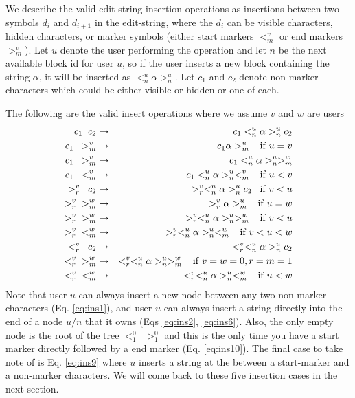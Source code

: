 \documentclass{amsart}
\begin{document}
We describe the valid edit-string insertion operations as insertions
between two symbols $d_i$ and $d_{i+1}$ in the edit-string, where the $d_i$
can be visible characters, hidden characters, or marker symbols (either start
markers $<^v_m$ or end markers $>^v_m$).  Let $u$ denote the user performing
the operation and let $n$ be the next available block id for user $u$, so if
the user inserts a new block containing the string $\alpha$, it will be inserted
as $<^u_n \alpha >^u_n$.  Let $c_1$ and $c_2$ denote non-marker characters
which could be either visible or hidden or one of each.

The following are the valid insert operations where we assume $v$ and $w$
are users
\begin{eqnarray}
c_1\;\; c_2 &\rightarrow& c_1 <^u_n \alpha >^u_n c_2 \label{eq:ins1}\\
c_1\;\; >^v_m &\rightarrow& c_1 \alpha >^u_m \;\;\; {\rm if}\; u=v \label{eq:ins2}\\
c_1\;\;>^v_m &\rightarrow& c_1 <^u_n \alpha >^u_n >^w_m \label{eq:ins3}\\
c_1 \;\;<^v_m &\rightarrow& c_1 <^u_n \alpha >^u_n <^v_m \;\;\; {\rm if}\; u<v \label{eq:ins4}\\
>^v_r \;\;c_2 &\rightarrow& >^v_r  <^u_n \alpha >^u_n c_2 \;\;\; {\rm if} \; v<u \label{eq:ins5}\\
>^v_r \;\;>^w_m &\rightarrow& >^v_r \alpha >^u_m \;\;\; {\rm if}\; u=w \label{eq:ins6}\\
>^v_r \;\;>^w_m &\rightarrow& >^v_r <^u_n \alpha >^u_n >^w_m \;\;\; {\rm if} \; v<u \label{eq:ins7}\\
>^v_r \;\;<^w_m &\rightarrow& >^v_r <^u_n \alpha >^u_n <^w_m \;\;\; {\rm if} \; v<u<w \label{eq:ins8}\\
<^v_r \;\;c_2 &\rightarrow& <^v_r  <^u_n \alpha >^u_n c_2\label{eq:ins9}\\
<^v_r \;\;>^w_m &\rightarrow& <^v_r <^u_n \alpha >^u_n >^w_m \;\;\; {\rm if} \; v=w=0, r=m=1 \label{eq:ins10}\\
<^v_r \;\;<^w_m &\rightarrow& <^v_r <^u_n \alpha >^u_n <^w_m \;\;\; {\rm if} \; u<w \label{eq:ins11}
\end{eqnarray}
Note that user $u$ can always insert a new node between any two non-marker
characters (Eq. \ref{eq:ins1}), and user $u$ can always insert a string
directly into the end of a node $u/n$ that it owns (Eqs \ref{eq:ins2}, \ref{eq:ins6}).
Also, the only empty node is the root of the tree $<^0_1\;\; >^0_1$ and this
is the only time you have a start marker directly followed by a end marker
(Eq. \ref{eq:ins10}).  The final case to take note of is Eq. \ref{eq:ins9} where
$u$ inserts a string at the between a start-marker and a non-marker characters.
We will come back to these five insertion cases in the next section.
\end{document}
